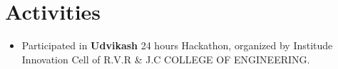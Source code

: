\documentclass[]{roshan-resume}
\begin{document}
\begin{minipage}[t]{0.66\textwidth}
		

		\section{Activities}
		\begin{itemize}
			\item Participated in \textbf{Udvikash} 24 hours Hackathon, organized by Institude Innovation Cell of R.V.R \& J.C COLLEGE OF ENGINEERING.
		\end{itemize}
		
	\end{minipage} 
\end{document}
